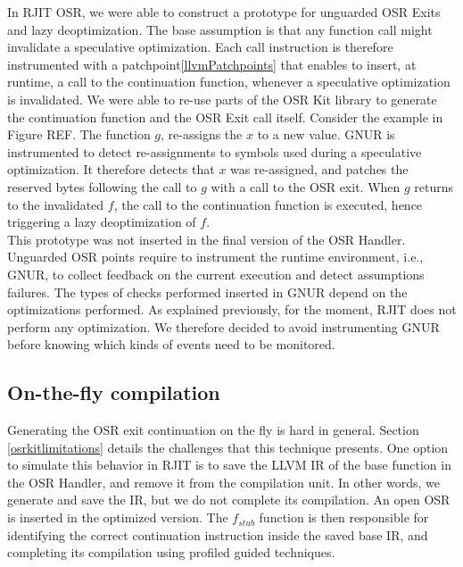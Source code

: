 In RJIT OSR, we were able to construct a prototype for unguarded OSR Exits and lazy deoptimization.
The base assumption is that any function call might invalidate a speculative optimization.
Each call instruction is therefore instrumented with a patchpoint\ref{llvmPatchpoints} that enables to insert, at runtime, a call to the continuation function, whenever a speculative optimization is invalidated.
We were able to re-use parts of the OSR Kit library to generate the continuation function and the OSR Exit call itself.
Consider the example in Figure REF.
The function $g$, re-assigns the $x$ to a new value.
GNUR is instrumented to detect re-assignments to symbols used during a speculative optimization.
It therefore detects that $x$ was re-assigned, and patches the reserved bytes following the call to $g$ with a call to the OSR exit.
When $g$ returns to the invalidated $f$, the call to the continuation function is executed, hence triggering a lazy deoptimization of $f$.\\

This prototype was not inserted in the final version of the OSR Handler.
Unguarded OSR points require to instrument the runtime environment, i.e., GNUR, to collect feedback on the current execution and detect assumptions failures.
The types of checks performed inserted in GNUR depend on the optimizations performed.
As explained previously, for the moment, RJIT does not perform any optimization. 
We therefore decided to avoid instrumenting GNUR before knowing which kinds of events need to be monitored.\\

\subsection{On-the-fly compilation}

Generating the OSR exit continuation on the fly is hard in general. 
Section \ref{osrkitlimitations} details the challenges that this technique presents.
One option to simulate this behavior in RJIT is to save the LLVM IR of the base function in the OSR Handler, and remove it from the compilation unit.
In other words, we generate and save the IR, but we do not complete its compilation.
An open OSR is inserted in the optimized version. 
The $f_{stub}$ function is then responsible for identifying the correct continuation instruction inside the saved base IR, and completing its compilation using profiled guided techniques.\\

